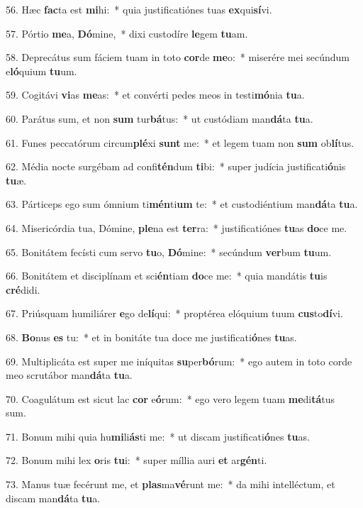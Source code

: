 56. Hæc \textbf{fac}ta est \textbf{mi}hi:~*  quia justificatiónes tuas \textbf{ex}qui\textbf{sí}vi.\

57. Pórtio \textbf{me}a, \textbf{Dó}mine,~*  dixi custodíre \textbf{le}gem \textbf{tu}am.\

58. Deprecátus sum fáciem tuam in toto \textbf{cor}de \textbf{me}o:~*  miserére mei secúndum e\textbf{ló}quium \textbf{tu}um.\

59. Cogitávi \textbf{vi}as \textbf{me}as:~*  et convérti pedes meos in testi\textbf{mó}nia \textbf{tu}a.\

60. Parátus sum, et non \textbf{sum} tur\textbf{bá}tus:~*  ut custódiam man\textbf{dá}ta \textbf{tu}a.\

61. Funes peccatórum circum\textbf{plé}xi \textbf{sunt} me:~*  et legem tuam non \textbf{sum} ob\textbf{lí}tus.\

62. Média nocte surgébam ad confi\textbf{tén}dum \textbf{ti}bi:~*  super judícia justificati\textbf{ó}nis \textbf{tu}æ.\

63. Párticeps ego sum ómnium ti\textbf{mén}ti\textbf{um} te:~*  et custodiéntium man\textbf{dá}ta \textbf{tu}a.\

64. Misericórdia tua, Dómine, \textbf{ple}na est \textbf{ter}ra:~*  justificatiónes \textbf{tu}as \textbf{do}ce me.\

65. Bonitátem fecísti cum servo \textbf{tu}o, \textbf{Dó}mine:~*  secúndum \textbf{ver}bum \textbf{tu}um.\

66. Bonitátem et disciplínam et sci\textbf{én}tiam \textbf{do}ce me:~*  quia mandátis \textbf{tu}is \textbf{cré}didi.\

67. Priúsquam humiliárer \textbf{e}go de\textbf{lí}qui:~*  proptérea elóquium tuum \textbf{cus}to\textbf{dí}vi.\

68. \textbf{Bo}nus \textbf{es} tu:~*  et in bonitáte tua doce me justificati\textbf{ó}nes \textbf{tu}as.\

69. Multiplicáta est super me iníquitas \textbf{su}per\textbf{bó}rum:~*  ego autem in toto corde meo scrutábor man\textbf{dá}ta \textbf{tu}a.\

70. Coagulátum est sicut lac \textbf{cor} e\textbf{ó}rum:~*  ego vero legem tuam \textbf{me}di\textbf{tá}tus sum.\

71. Bonum mihi quia hu\textbf{mi}li\textbf{ás}ti me:~*  ut discam justificati\textbf{ó}nes \textbf{tu}as.\

72. Bonum mihi lex \textbf{o}ris \textbf{tu}i:~*  super míllia auri \textbf{et} ar\textbf{gén}ti.\

73. Manus tuæ fecérunt me, et \textbf{plas}ma\textbf{vé}runt me:~*  da mihi intelléctum, et discam man\textbf{dá}ta \textbf{tu}a.\

